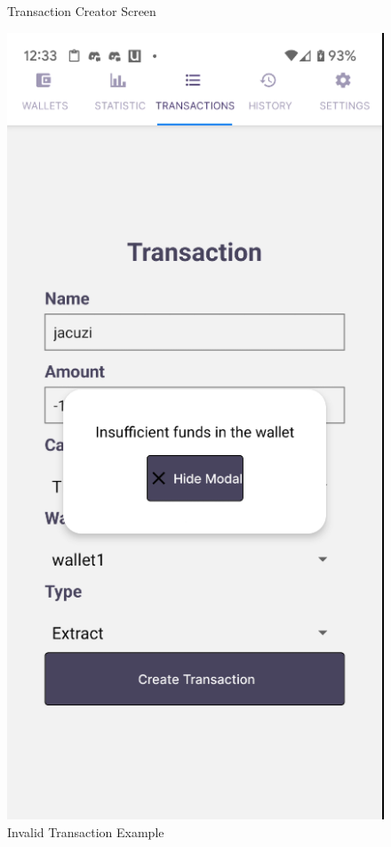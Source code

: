 \begin{figure}[htbp]
\begin{minipage}[t]{0.2\textwidth}
        \caption{Transaction Creator Screen}
        \label{fig:transaction-creator}
    \end{minipage}
    \hfill
    \begin{minipage}[t]{0.2\textwidth}
        \centering
        \includegraphics[width=\textwidth]{Screen Shots/Moneager/Inavlid Transaction Example.png}
        \caption{Invalid Transaction Example}
        \label{fig:invalid-transaction}
    \end{minipage}
\end{figure}


